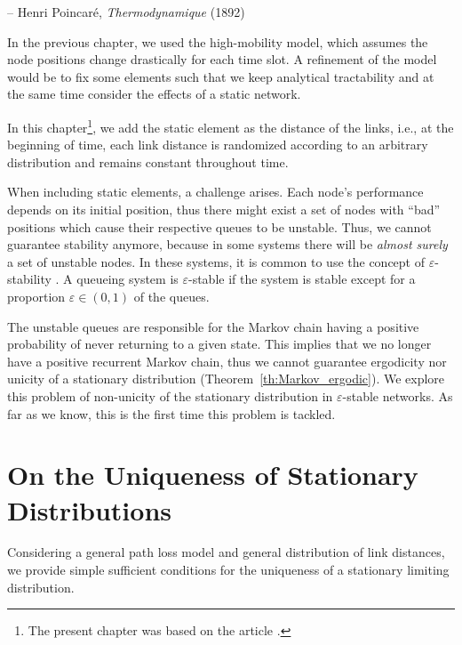 %
{-- Henri Poincaré, \textit{Thermodynamique} %
(1892)}

In the previous chapter, we used the high-mobility model, which assumes the node positions change drastically for each time slot.
%
A refinement of the model would be to fix some elements such that we keep analytical tractability and at the same time consider the effects of a static network.

In this chapter\footnote{The present chapter was based on the article \cite{dester2021unique}.}, we add the static element as the distance of the links, i.e., at the beginning of time, each link distance is randomized according to an arbitrary distribution and remains constant throughout time.

When including static elements, a challenge arises.
%
Each node's performance depends on its initial position, thus there might exist a set of nodes with ``bad'' positions which cause their respective queues to be unstable.
%
Thus, we cannot guarantee stability anymore, because in some systems there will be \textit{almost surely} a set of unstable nodes.
%
In these systems, it is common to use the concept of $\varepsilon$-stability \cite{zhong2016stability}. A queueing system is $\varepsilon$-stable if the system is stable except for a proportion $\varepsilon\in(0,1)$ of the queues.

The unstable queues are responsible for the Markov chain having a positive probability of never returning to a given state. This implies that we no longer have a positive recurrent Markov chain, thus we cannot guarantee ergodicity nor unicity of a stationary distribution (Theorem~\ref{th:Markov_ergodic}).
%
We explore this problem of non-unicity of the stationary distribution in $\varepsilon$-stable networks.
%
As far as we know, this is the first time this problem is tackled.

\section{On the Uniqueness of Stationary Distributions}

Considering a general path loss model and general distribution of link distances, we provide simple sufficient conditions for the uniqueness of a stationary limiting distribution.

